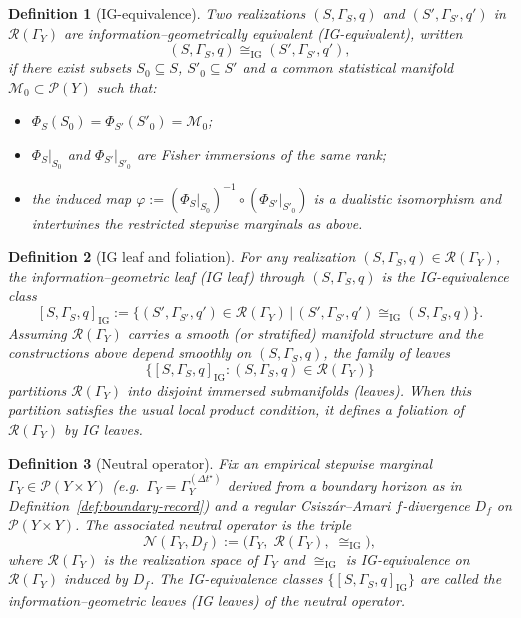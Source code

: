 \documentclass[11pt]{article}
\newtheorem{definition}{Definition}
\newcommand{\Pcal}{\mathcal{P}}
\newcommand{\Ncal}{\mathcal{N}}
\begin{document}
\begin{definition}[IG-equivalence]
Two realizations $(S,\Gamma_S,q)$ and $(S',\Gamma_{S'},q')$ in
$\mathcal R(\Gamma_Y)$ are \emph{information--geometrically equivalent}
(IG-equivalent), written
\[
  (S,\Gamma_S,q) \cong_{\mathrm{IG}} (S',\Gamma_{S'},q'),
\]
if there exist subsets $S_0\subseteq S$, $S'_0\subseteq S'$ and a common
statistical manifold $\mathcal M_0\subset\Pcal(Y)$ such that:
\begin{itemize}[leftmargin=1.5em]
  \item $\Phi_S(S_0) = \Phi_{S'}(S'_0) = \mathcal M_0$;
  \item $\Phi_S|_{S_0}$ and $\Phi_{S'}|_{S'_0}$ are Fisher immersions of
  the same rank;
  \item the induced map
  $\varphi := (\Phi_S|_{S_0})^{-1}\circ(\Phi_{S'}|_{S'_0})$ is a
  dualistic isomorphism and intertwines the restricted stepwise marginals
  as above.
\end{itemize}
\end{definition}

\begin{definition}[IG leaf and foliation]
For any realization $(S,\Gamma_S,q)\in\mathcal R(\Gamma_Y)$, the
\emph{information--geometric leaf} (IG leaf) through $(S,\Gamma_S,q)$ is
the IG-equivalence class
\[
  [S,\Gamma_S,q]_{\mathrm{IG}}
  :=
  \bigl\{
    (S',\Gamma_{S'},q')\in\mathcal R(\Gamma_Y)
    \,\big|\,
    (S',\Gamma_{S'},q')\cong_{\mathrm{IG}}(S,\Gamma_S,q)
  \bigr\}.
\]
Assuming $\mathcal R(\Gamma_Y)$ carries a smooth (or stratified) manifold
structure and the constructions above depend smoothly on
$(S,\Gamma_S,q)$, the family of leaves
\[
  \bigl\{[S,\Gamma_S,q]_{\mathrm{IG}} : (S,\Gamma_S,q)\in\mathcal R(\Gamma_Y)\bigr\}
\]
partitions $\mathcal R(\Gamma_Y)$ into disjoint immersed submanifolds
(\emph{leaves}). When this partition satisfies the usual local product
condition, it defines a foliation of $\mathcal R(\Gamma_Y)$ by IG leaves.
\end{definition}

\begin{definition}[Neutral operator]
\label{def:neutral-operator}
Fix an empirical stepwise marginal $\Gamma_Y \in \mathcal{P}(Y\times Y)$ (e.g.\ $\Gamma_Y=\Gamma_Y^{(\Delta t^\star)}$ derived from a boundary horizon as in Definition~\ref{def:boundary-record})
and a regular Csiszár--Amari $f$-divergence $D_f$ on
$\mathcal{P}(Y\times Y)$. The associated \emph{neutral operator} is the
triple
\[
  \Ncal(\Gamma_Y,D_f)
  :=
  \bigl(\Gamma_Y,\; \mathcal{R}(\Gamma_Y),\; \cong_{\mathrm{IG}}\bigr),
\]
where $\mathcal{R}(\Gamma_Y)$ is the realization space of $\Gamma_Y$
and $\cong_{\mathrm{IG}}$ is IG-equivalence on
$\mathcal{R}(\Gamma_Y)$ induced by $D_f$.
The IG-equivalence classes
$\{[S,\Gamma_S,q]_{\mathrm{IG}}\}$ are called the
\emph{information--geometric leaves} (IG leaves) of the neutral operator.
\end{definition}
\end{document}
